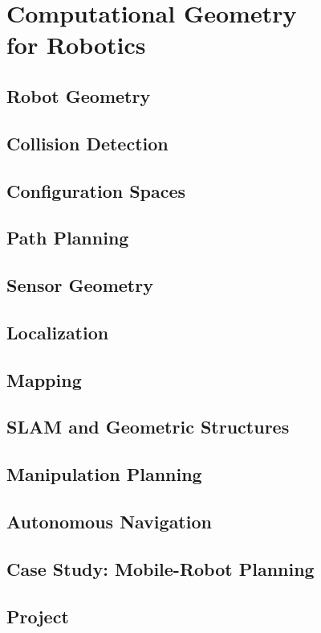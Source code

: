 \chapter[Computational Geometry for Robotics]{Computational Geometry\\ for Robotics}
\label{ch:applications_robotics}


\section{Robot Geometry}
\label{sec:robotics_robot_geometry}

\section{Collision Detection}
\label{sec:robotics_collision}

\section{Configuration Spaces}
\label{sec:robotics_configuration_spaces}

\section{Path Planning}
\label{sec:robotics_path_planning}

\section{Sensor Geometry}
\label{sec:robotics_sensors}

\section{Localization}
\label{sec:robotics_localization}

\section{Mapping}
\label{sec:robotics_mapping}

\section{SLAM and Geometric Structures}
\label{sec:robotics_slam}

\section{Manipulation Planning}
\label{sec:robotics_manipulation}

\section{Autonomous Navigation}
\label{sec:robotics_navigation}

\section{Case Study: Mobile-Robot Planning}
\label{sec:robotics_case_study}

\section{Project}
\label{sec:robotics_project}
